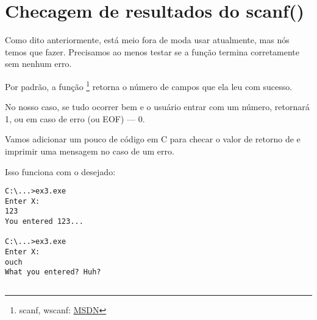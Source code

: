 \section{Checagem de resultados do scanf()}

Como dito anteriormente, está meio fora de moda usar \scanf atualmente, mas nós temos que fazer.
Precisamos ao menos testar se a função \scanf termina corretamente sem nenhum erro.



Por padrão, a função \scanf\footnote{scanf, wscanf: \href{http://go.yurichev.com/17255}{MSDN}} retorna o número de campos que ela leu com sucesso.

No nosso caso, se tudo ocorrer bem e o usuário entrar com um número, \scanf retornará 1, ou em caso de erro (ou \ac{EOF}) --- 0.

Vamos adicionar um pouco de código em C para checar o valor de retorno de \scanf e imprimir uma mensagem no caso de um erro.

Isso funciona com o desejado:

\begin{lstlisting}
C:\...>ex3.exe
Enter X:
123
You entered 123...

C:\...>ex3.exe
Enter X:
ouch
What you entered? Huh?
\end{lstlisting}



\ifdefined\IncludeARM

\fi
\ifdefined\IncludeMIPS

\fi

\ifdefined\IncludeExercises
\subsection{\Exercise}

\PTBRph{}

\fi
